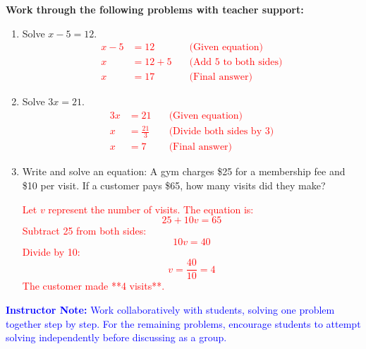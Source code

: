 \documentclass[12pt]{article}
\begin{document}
\begin{tcolorbox}[colframe=black!60, colback=white, 
coltitle=black, colbacktitle=black!15, fonttitle=\bfseries\Large, 
title=Guided Practice, halign title=center, left=10pt, right=10pt, top=10pt, bottom=15pt]
\textbf{Work through the following problems with teacher support:}
\begin{enumerate}[itemsep=3em]
    \item Solve \( x - 5 = 12 \). 
    \textcolor{red}{
    \begin{align*}
    x - 5 &= 12  \quad &\text{(Given equation)} \\
    x &= 12 + 5  \quad &\text{(Add 5 to both sides)} \\
    x &= 17  \quad &\text{(Final answer)}
    \end{align*}
    }
    \item Solve \( 3x = 21 \). 
    \textcolor{red}{
    \begin{align*}
    3x &= 21  \quad &\text{(Given equation)} \\
    x &= \frac{21}{3}  \quad &\text{(Divide both sides by 3)} \\
    x &= 7  \quad &\text{(Final answer)}
    \end{align*}}
    \item Write and solve an equation: A gym charges \$25 for a membership fee and \$10 per visit. If a customer pays \$65, how many visits did they make?

    \textcolor{red}{
    Let \( v \) represent the number of visits. The equation is:
    \[
    25 + 10v = 65
    \]
    Subtract 25 from both sides:
    \[
    10v = 40
    \]
    Divide by 10:
    \[
    v = \frac{40}{10} = 4
    \]
    The customer made **4 visits**.
    }
\end{enumerate}

\textcolor{blue}{\textbf{Instructor Note:} Work collaboratively with students, solving one problem together step by step. For the remaining problems, encourage students to attempt solving independently before discussing as a group.}
\end{tcolorbox}
\end{document}
